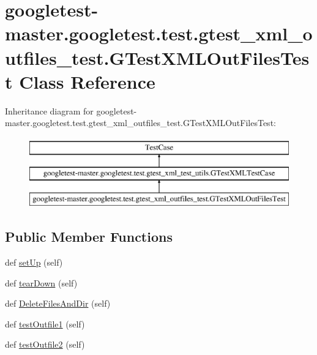 \hypertarget{classgoogletest-master_1_1googletest_1_1test_1_1gtest__xml__outfiles__test_1_1_g_test_x_m_l_out_files_test}{}\section{googletest-\/master.googletest.\+test.\+gtest\+\_\+xml\+\_\+outfiles\+\_\+test.\+G\+Test\+X\+M\+L\+Out\+Files\+Test Class Reference}
\label{classgoogletest-master_1_1googletest_1_1test_1_1gtest__xml__outfiles__test_1_1_g_test_x_m_l_out_files_test}
Inheritance diagram for googletest-\/master.googletest.\+test.\+gtest\+\_\+xml\+\_\+outfiles\+\_\+test.\+G\+Test\+X\+M\+L\+Out\+Files\+Test\+:\begin{figure}[H]
\begin{center}
\leavevmode
\includegraphics[height=3.000000cm]{d4/d89/classgoogletest-master_1_1googletest_1_1test_1_1gtest__xml__outfiles__test_1_1_g_test_x_m_l_out_files_test}
\end{center}
\end{figure}
\subsection*{Public Member Functions}
\begin{DoxyCompactItemize}
\item 
def \mbox{\hyperlink{classgoogletest-master_1_1googletest_1_1test_1_1gtest__xml__outfiles__test_1_1_g_test_x_m_l_out_files_test_ac2a266cf1176bef92ce4d5d83c4fb978}{set\+Up}} (self)
\item 
def \mbox{\hyperlink{classgoogletest-master_1_1googletest_1_1test_1_1gtest__xml__outfiles__test_1_1_g_test_x_m_l_out_files_test_a05d7d03633012805a582ce69faf7237c}{tear\+Down}} (self)
\item 
def \mbox{\hyperlink{classgoogletest-master_1_1googletest_1_1test_1_1gtest__xml__outfiles__test_1_1_g_test_x_m_l_out_files_test_add779e761cb2ac99408bc94767f5ba4e}{Delete\+Files\+And\+Dir}} (self)
\item 
def \mbox{\hyperlink{classgoogletest-master_1_1googletest_1_1test_1_1gtest__xml__outfiles__test_1_1_g_test_x_m_l_out_files_test_aeac7d71efe73b050ca373fbdfbc4237e}{test\+Outfile1}} (self)
\item 
def \mbox{\hyperlink{classgoogletest-master_1_1googletest_1_1test_1_1gtest__xml__outfiles__test_1_1_g_test_x_m_l_out_files_test_a9b90f8bd017d5b316c50479f3bbbc172}{test\+Outfile2}} (self)
\end{DoxyCompactItemize}

